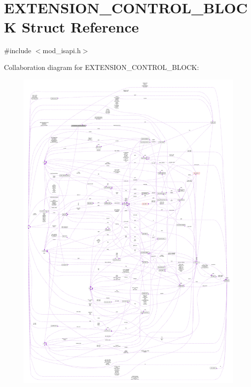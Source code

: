 \hypertarget{structEXTENSION__CONTROL__BLOCK}{}\section{E\+X\+T\+E\+N\+S\+I\+O\+N\+\_\+\+C\+O\+N\+T\+R\+O\+L\+\_\+\+B\+L\+O\+CK Struct Reference}
\label{structEXTENSION__CONTROL__BLOCK}


{\ttfamily \#include $<$mod\+\_\+isapi.\+h$>$}



Collaboration diagram for E\+X\+T\+E\+N\+S\+I\+O\+N\+\_\+\+C\+O\+N\+T\+R\+O\+L\+\_\+\+B\+L\+O\+CK\+:
\nopagebreak
\begin{figure}[H]
\begin{center}
\leavevmode
\includegraphics[width=350pt]{structEXTENSION__CONTROL__BLOCK__coll__graph}
\end{center}
\end{figure}

